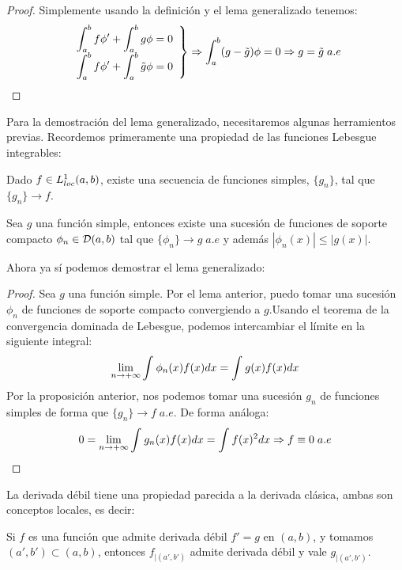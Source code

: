 \begin{proof}
Simplemente usando la definición y el lema generalizado tenemos:
\[
\left.
\begin{array}{c}
\displaystyle\int_{ a }^{ b } f\phi'+\displaystyle\int_{ a }^{ b } g\phi=0 \\
\displaystyle\int_{ a }^{ b } f\phi'+\displaystyle\int_{ a }^{ b } \tilde{g}\phi=0
\end{array}
\right\} \Rightarrow \displaystyle\int_{ a }^{ b } (g-\tilde{g})\phi=0 \Rightarrow g=\tilde{g} \; a.e
\]
\end{proof}

Para la demostración del lema generalizado, necesitaremos algunas herramientos previas. Recordemos primeramente una propiedad de las funciones Lebesgue integrables:

\begin{prop}
Dado $f\in L^1_{loc}(a,b)$, existe una secuencia de funciones simples, $\{g_n\}$, tal que $\{g_n\}\longrightarrow f$.
\end{prop}

\begin{lemma}
Sea $g$ una función simple, entonces existe una sucesión de funciones de soporte compacto $\phi_n\in\mathcal{D}(a,b)$ tal que $\{\phi_n\}\longrightarrow g \; a.e$ y además $|\phi_n(x)|\leq|g(x)|$.
\end{lemma}

Ahora ya sí podemos demostrar el lema generalizado:

\begin{proof}
Sea $g$ una función simple. Por el lema anterior, puedo tomar una sucesión $\phi_n$ de funciones de soporte compacto convergiendo a $g$.Usando el teorema de la convergencia dominada de Lebesgue, podemos intercambiar el límite en la siguiente integral:
\[
\displaystyle\lim_{  n  \to +\infty }  \displaystyle\int_{  }^{  } \phi_n(x)f(x)dx =\displaystyle\int_{  }^{  } g(x)f(x)dx
\]
Por la proposición anterior, nos podemos tomar una sucesión $g_n$ de funciones simples de forma que $\{g_n\}\longrightarrow f \; a.e$. De forma análoga:
\[
0=\displaystyle\lim_{  n  \to +\infty }  \displaystyle\int_{  }^{  } g_n(x)f(x)dx =\displaystyle\int_{  }^{  } f(x)^2dx \Rightarrow f\equiv 0 \; a.e
\]
\end{proof}

La derivada débil tiene una propiedad parecida a la derivada clásica, ambas son conceptos locales, es decir:

\begin{prop}
Si $f$ es una función que admite derivada débil $f'=g$ en $(a,b)$, y tomamos $(a',b')\subset(a,b)$, entonces $f_{|(a',b')}$ admite derivada débil y vale $g_{|(a',b')}$.
\end{prop}

